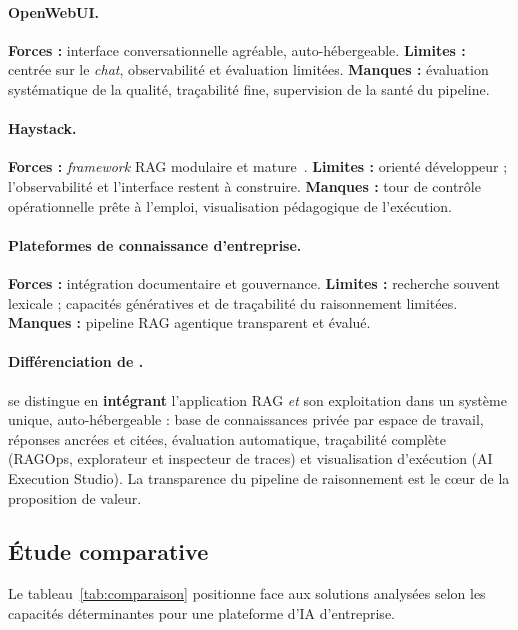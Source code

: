 \paragraph{OpenWebUI.} \textbf{Forces :} interface conversationnelle agréable,
auto-hébergeable. \textbf{Limites :} centrée sur le \emph{chat}, observabilité et
évaluation limitées. \textbf{Manques :} évaluation systématique de la qualité,
traçabilité fine, supervision de la santé du pipeline.

\paragraph{Haystack.} \textbf{Forces :} \emph{framework} RAG modulaire et
mature~\cite{haystack}. \textbf{Limites :} orienté développeur ; l'observabilité
et l'interface restent à construire. \textbf{Manques :} tour de contrôle
opérationnelle prête à l'emploi, visualisation pédagogique de l'exécution.

\paragraph{Plateformes de connaissance d'entreprise.} \textbf{Forces :}
intégration documentaire et gouvernance. \textbf{Limites :} recherche souvent
lexicale ; capacités génératives et de traçabilité du raisonnement limitées.
\textbf{Manques :} pipeline RAG agentique transparent et évalué.

\paragraph{Différenciation de \devpilot{}.} \devpilot{} se distingue en
\textbf{intégrant} l'application RAG \emph{et} son exploitation dans un système
unique, auto-hébergeable : base de connaissances privée par espace de travail,
réponses ancrées et citées, évaluation automatique, traçabilité complète
(RAGOps, explorateur et inspecteur de traces) et visualisation d'exécution
(AI Execution Studio). La transparence du pipeline de raisonnement est le c{\oe}ur
de la proposition de valeur.

\subsection{Étude comparative}
Le tableau~\ref{tab:comparaison} positionne \devpilot{} face aux solutions
analysées selon les capacités déterminantes pour une plateforme d'IA d'entreprise.

